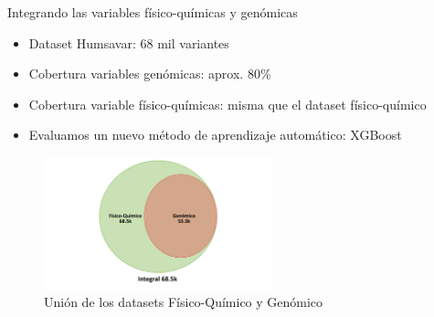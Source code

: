 \documentclass[
  spanish,
  ignorenonframetext,
]{beamer}
\providecommand{\tightlist}{%
  \setlength{\itemsep}{0pt}\setlength{\parskip}{0pt}}
\begin{document}
\begin{frame}{Integrando las variables físico-químicas y genómicas}
\protect\hypertarget{integrando-las-variables-fuxedsico-quuxedmicas-y-genuxf3micas}{}

\begin{itemize}
\tightlist
\item
  Dataset Humsavar: 68 mil variantes
\item
  Cobertura variables genómicas: aprox. 80\%
\item
  Cobertura variable físico-químicas: misma que el dataset
  físico-químico
\item
  Evaluamos un nuevo método de aprendizaje automático: XGBoost
\end{itemize}

\begin{figure}
\centering
\includegraphics[width=2.60417in,height=\textheight]{interseccion_integral.pdf}
\caption{Unión de los datasets Físico-Químico y Genómico}
\end{figure}

\end{frame}
\end{document}

